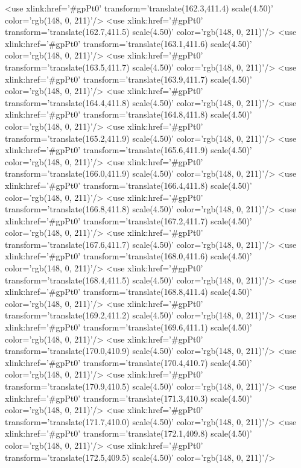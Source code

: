 	<use xlink:href='#gpPt0' transform='translate(162.3,411.4) scale(4.50)' color='rgb(148,   0, 211)'/>
	<use xlink:href='#gpPt0' transform='translate(162.7,411.5) scale(4.50)' color='rgb(148,   0, 211)'/>
	<use xlink:href='#gpPt0' transform='translate(163.1,411.6) scale(4.50)' color='rgb(148,   0, 211)'/>
	<use xlink:href='#gpPt0' transform='translate(163.5,411.7) scale(4.50)' color='rgb(148,   0, 211)'/>
	<use xlink:href='#gpPt0' transform='translate(163.9,411.7) scale(4.50)' color='rgb(148,   0, 211)'/>
	<use xlink:href='#gpPt0' transform='translate(164.4,411.8) scale(4.50)' color='rgb(148,   0, 211)'/>
	<use xlink:href='#gpPt0' transform='translate(164.8,411.8) scale(4.50)' color='rgb(148,   0, 211)'/>
	<use xlink:href='#gpPt0' transform='translate(165.2,411.9) scale(4.50)' color='rgb(148,   0, 211)'/>
	<use xlink:href='#gpPt0' transform='translate(165.6,411.9) scale(4.50)' color='rgb(148,   0, 211)'/>
	<use xlink:href='#gpPt0' transform='translate(166.0,411.9) scale(4.50)' color='rgb(148,   0, 211)'/>
	<use xlink:href='#gpPt0' transform='translate(166.4,411.8) scale(4.50)' color='rgb(148,   0, 211)'/>
	<use xlink:href='#gpPt0' transform='translate(166.8,411.8) scale(4.50)' color='rgb(148,   0, 211)'/>
	<use xlink:href='#gpPt0' transform='translate(167.2,411.7) scale(4.50)' color='rgb(148,   0, 211)'/>
	<use xlink:href='#gpPt0' transform='translate(167.6,411.7) scale(4.50)' color='rgb(148,   0, 211)'/>
	<use xlink:href='#gpPt0' transform='translate(168.0,411.6) scale(4.50)' color='rgb(148,   0, 211)'/>
	<use xlink:href='#gpPt0' transform='translate(168.4,411.5) scale(4.50)' color='rgb(148,   0, 211)'/>
	<use xlink:href='#gpPt0' transform='translate(168.8,411.4) scale(4.50)' color='rgb(148,   0, 211)'/>
	<use xlink:href='#gpPt0' transform='translate(169.2,411.2) scale(4.50)' color='rgb(148,   0, 211)'/>
	<use xlink:href='#gpPt0' transform='translate(169.6,411.1) scale(4.50)' color='rgb(148,   0, 211)'/>
	<use xlink:href='#gpPt0' transform='translate(170.0,410.9) scale(4.50)' color='rgb(148,   0, 211)'/>
	<use xlink:href='#gpPt0' transform='translate(170.4,410.7) scale(4.50)' color='rgb(148,   0, 211)'/>
	<use xlink:href='#gpPt0' transform='translate(170.9,410.5) scale(4.50)' color='rgb(148,   0, 211)'/>
	<use xlink:href='#gpPt0' transform='translate(171.3,410.3) scale(4.50)' color='rgb(148,   0, 211)'/>
	<use xlink:href='#gpPt0' transform='translate(171.7,410.0) scale(4.50)' color='rgb(148,   0, 211)'/>
	<use xlink:href='#gpPt0' transform='translate(172.1,409.8) scale(4.50)' color='rgb(148,   0, 211)'/>
	<use xlink:href='#gpPt0' transform='translate(172.5,409.5) scale(4.50)' color='rgb(148,   0, 211)'/>
